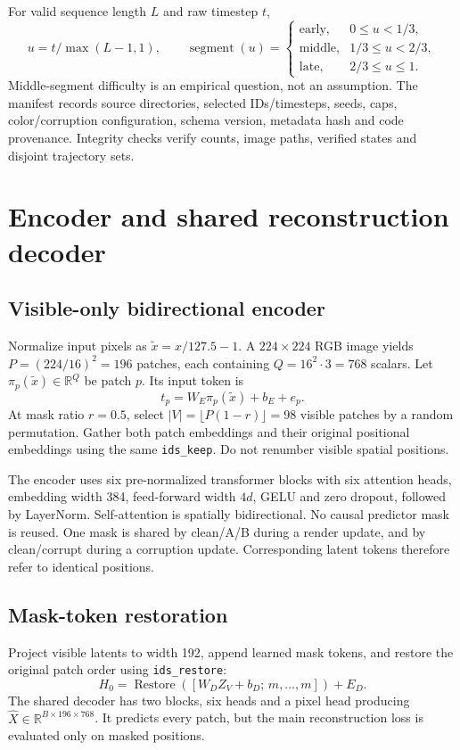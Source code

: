 \documentclass[11pt,a4paper]{article}
\newcommand{\code}[1]{\nolinkurl{#1}}
\newcommand{\R}{\mathbb{R}}
\begin{document}
For valid sequence length $L$ and raw timestep $t$,
\begin{equation}
u=t/\max(L-1,1),\qquad
\operatorname{segment}(u)=
\begin{cases}
\text{early},&0\le u<1/3,\\
\text{middle},&1/3\le u<2/3,\\
\text{late},&2/3\le u\le1.
\end{cases}
\end{equation}
Middle-segment difficulty is an empirical question, not an assumption.
The manifest records source directories, selected IDs/timesteps, seeds, caps,
color/corruption configuration, schema version, metadata hash and code provenance.
Integrity checks verify counts, image paths, verified states and disjoint trajectory sets.

\section{Encoder and shared reconstruction decoder}
\subsection{Visible-only bidirectional encoder}
Normalize input pixels as $\tilde{x}=x/127.5-1$. A $224\times224$ RGB image yields
$P=(224/16)^2=196$ patches, each containing $Q=16^2\cdot3=768$ scalars.
Let $\pi_p(\tilde{x})\in\R^Q$ be patch $p$. Its input token is
\begin{equation}
t_p=W_E\pi_p(\tilde{x})+b_E+e_p.
\end{equation}
At mask ratio $r=0.5$, select $|V|=\lfloor P(1-r)\rfloor=98$ visible patches by a
random permutation. Gather both patch embeddings and their original positional
embeddings using the same \code{ids_keep}. Do not renumber visible spatial positions.

The encoder uses six pre-normalized transformer blocks with six attention heads,
embedding width 384, feed-forward width $4d$, GELU and zero dropout, followed by
LayerNorm. Self-attention is spatially bidirectional. No causal predictor mask is reused.
One mask is shared by clean/A/B during a render update, and by clean/corrupt during
a corruption update. Corresponding latent tokens therefore refer to identical positions.

\subsection{Mask-token restoration}
Project visible latents to width 192, append learned mask tokens, and restore
the original patch order using \code{ids_restore}:
\begin{equation}
H_0=\operatorname{Restore}\left([W_DZ_V+b_D;\,m,\ldots,m]\right)+E_D.
\end{equation}
The shared decoder has two blocks, six heads and a pixel head producing
$\widehat{X}\in\R^{B\times196\times768}$. It predicts every patch, but the main
reconstruction loss is evaluated only on masked positions.
\end{document}
